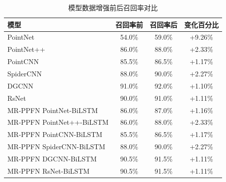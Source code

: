 \begin{table}[htbp]
    \ContinuedFloat
    \centering

    \begin{subtable}{\linewidth}
        \centering
        \caption{模型数据增强前后召回率对比}
        \begin{tabular}{lccc}
            \toprule
            \textbf{模型} & \textbf{召回率前} & \textbf{召回率后} & \textbf{变化百分比} \\
            \midrule
            PointNet & 54.0\% & 59.0\% & +9.26\% \\
            PointNet++ & 86.0\% & 88.0\% & +2.33\% \\
            PointCNN & 85.5\% & 86.5\% & +1.17\% \\
            SpiderCNN & 88.0\% & 90.0\% & +2.27\% \\
            DGCNN & 91.0\% & 92.0\% & +1.10\% \\
            RsNet & 90.0\% & 91.0\% & +1.11\% \\
            MR-PPFN PointNet-BiLSTM & 86.0\% & 87.0\% & +1.16\% \\
            MR-PPFN PointNet++-BiLSTM & 86.0\% & 88.0\% & +2.33\% \\
            MR-PPFN PointCNN-BiLSTM & 85.5\% & 86.5\% & +1.17\% \\
            MR-PPFN SpiderCNN-BiLSTM & 88.0\% & 90.0\% & +2.27\% \\
            MR-PPFN DGCNN-BiLSTM & 90.5\% & 91.5\% & +1.11\% \\
            MR-PPFN RsNet-BiLSTM & 90.5\% & 91.5\% & +1.11\% \\
            \bottomrule
        \end{tabular}
        \label{tab:recall-comparison}
    \end{subtable}

    \vspace{0.4cm}


\end{table}
